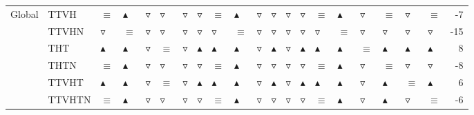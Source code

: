 \begin{table}
\begin{tabular}{llllllllllllllllllllr}
Global & TTVH &          $\equiv$ &  $\blacktriangle$ &  $\triangledown$ &   $\triangledown$ &   $\triangledown$ &   $\triangledown$ &          $\equiv$ &  $\blacktriangle$ &   $\triangledown$ &   $\triangledown$ &   $\triangledown$ &   $\triangledown$ &          $\equiv$ &  $\blacktriangle$ &   $\triangledown$ &          $\equiv$ &   $\triangledown$ &          $\equiv$ &       -7 \\
       & TTVHN &   $\triangledown$ &          $\equiv$ &  $\triangledown$ &   $\triangledown$ &   $\triangledown$ &   $\triangledown$ &   $\triangledown$ &          $\equiv$ &   $\triangledown$ &   $\triangledown$ &   $\triangledown$ &   $\triangledown$ &   $\triangledown$ &          $\equiv$ &   $\triangledown$ &   $\triangledown$ &   $\triangledown$ &   $\triangledown$ &      -15 \\
       & THT &  $\blacktriangle$ &  $\blacktriangle$ &  $\triangledown$ &          $\equiv$ &   $\triangledown$ &  $\blacktriangle$ &  $\blacktriangle$ &  $\blacktriangle$ &   $\triangledown$ &  $\blacktriangle$ &   $\triangledown$ &  $\blacktriangle$ &  $\blacktriangle$ &  $\blacktriangle$ &          $\equiv$ &  $\blacktriangle$ &  $\blacktriangle$ &  $\blacktriangle$ &        8 \\
       & THTN &          $\equiv$ &  $\blacktriangle$ &  $\triangledown$ &   $\triangledown$ &   $\triangledown$ &   $\triangledown$ &          $\equiv$ &  $\blacktriangle$ &   $\triangledown$ &   $\triangledown$ &   $\triangledown$ &   $\triangledown$ &          $\equiv$ &  $\blacktriangle$ &   $\triangledown$ &          $\equiv$ &   $\triangledown$ &   $\triangledown$ &       -8 \\
       & TTVHT &  $\blacktriangle$ &  $\blacktriangle$ &  $\triangledown$ &          $\equiv$ &   $\triangledown$ &  $\blacktriangle$ &  $\blacktriangle$ &  $\blacktriangle$ &   $\triangledown$ &  $\blacktriangle$ &   $\triangledown$ &  $\blacktriangle$ &  $\blacktriangle$ &  $\blacktriangle$ &   $\triangledown$ &  $\blacktriangle$ &          $\equiv$ &  $\blacktriangle$ &        6 \\
       & TTVHTN &          $\equiv$ &  $\blacktriangle$ &  $\triangledown$ &   $\triangledown$ &   $\triangledown$ &   $\triangledown$ &          $\equiv$ &  $\blacktriangle$ &   $\triangledown$ &   $\triangledown$ &   $\triangledown$ &   $\triangledown$ &          $\equiv$ &  $\blacktriangle$ &   $\triangledown$ &  $\blacktriangle$ &   $\triangledown$ &          $\equiv$ &       -6 \\
\bottomrule
\end{tabular}
\end{table}
